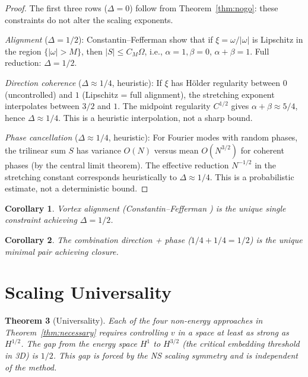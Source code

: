 \documentclass[12pt]{article}
\newtheorem{theorem}{Theorem}[section]
\newtheorem{corollary}[theorem]{Corollary}
\begin{document}
\begin{proof}
The first three rows ($\Delta = 0$) follow from
Theorem~\ref{thm:nogo}: these constraints do not
alter the scaling exponents.

\emph{Alignment} ($\Delta = 1/2$):
Constantin--Fefferman \cite{cf1993} show that
if $\xi = \omega/|\omega|$ is Lipschitz in the
region $\{|\omega| > M\}$, then
$|S| \leq C_M \Omega$, i.e., $\alpha = 1, \beta = 0$,
$\alpha + \beta = 1$. Full reduction: $\Delta = 1/2$.

\emph{Direction coherence} ($\Delta \approx 1/4$, heuristic):
If $\xi$ has H\"older regularity between $0$ (uncontrolled)
and $1$ (Lipschitz = full alignment), the stretching
exponent interpolates between $3/2$ and $1$.
The midpoint regularity $C^{1/2}$ gives
$\alpha + \beta \approx 5/4$, hence $\Delta \approx 1/4$.
This is a heuristic interpolation, not a sharp bound.

\emph{Phase cancellation} ($\Delta \approx 1/4$, heuristic):
For Fourier modes with random phases, the trilinear
sum $S$ has variance $O(N)$ versus mean $O(N^{3/2})$
for coherent phases (by the central limit theorem).
The effective reduction $N^{-1/2}$ in the stretching
constant corresponds heuristically to $\Delta \approx 1/4$.
This is a probabilistic estimate, not a deterministic bound.
\end{proof}

\begin{corollary}\label{cor:unique}
Vortex alignment (Constantin--Fefferman \cite{cf1993})
is the unique single constraint achieving $\Delta = 1/2$.
\end{corollary}

\begin{corollary}
The combination direction + phase ($1/4 + 1/4 = 1/2$)
is the unique minimal pair achieving closure.
\end{corollary}

\section{Scaling Universality}

\begin{theorem}[Universality]\label{thm:universal}
Each of the four non-energy approaches
in Theorem~\ref{thm:necessary} requires controlling
$v$ in a space at least as strong as $H^{1/2}$.
The gap from the energy space $H^1$ to $H^{3/2}$
(the critical embedding threshold in 3D) is $1/2$.
This gap is forced by the NS scaling symmetry
and is independent of the method.
\end{theorem}
\end{document}
